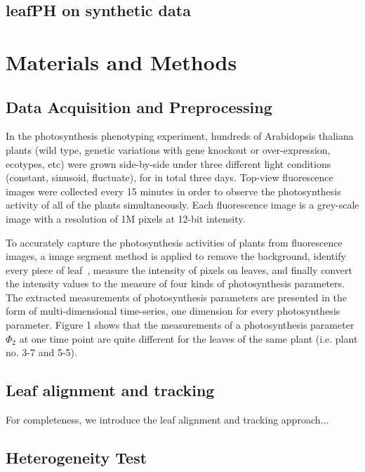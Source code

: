 {\subsection*{leafPH on synthetic data}

\section*{Materials and Methods}

\subsection*{Data Acquisition and Preprocessing}

In the photosynthesis phenotyping experiment, hundreds of Arabidopsis thaliana plants (wild type, genetic variations with gene knockout or over-expression, ecotypes, etc) were grown side-by-side under three different light conditions (constant, sinusoid, fluctuate), for in total three days.
%
Top-view fluorescence images were collected every 15 minutes in order to observe the photosynthesis activity of all of the plants simultaneously. Each fluorescence image is a grey-scale image with a resolution of 1M pixels at 12-bit intensity.

To accurately capture the photosynthesis activities of plants from fluorescence images, a image segment method is applied to remove the background, identify every piece of leaf~\cite{yin2014}, measure the intensity of pixels on leaves, and finally convert the intensity values to the measure of four kinds of photosynthesis parameters.
%
The extracted measurements of photosynthesis parameters are presented in the form of multi-dimensional time-series, one dimension for every photosynthesis parameter.
%
Figure 1 shows that the measurements of a photosynthesis parameter $\Phi_2$ at one time point are quite different for the leaves of the same plant  (i.e. plant no. 3-7 and 5-5).

\subsection*{Leaf alignment and tracking}

For completeness, we introduce the leaf alignment and tracking approach...

\subsection*{Heterogeneity Test}

}
